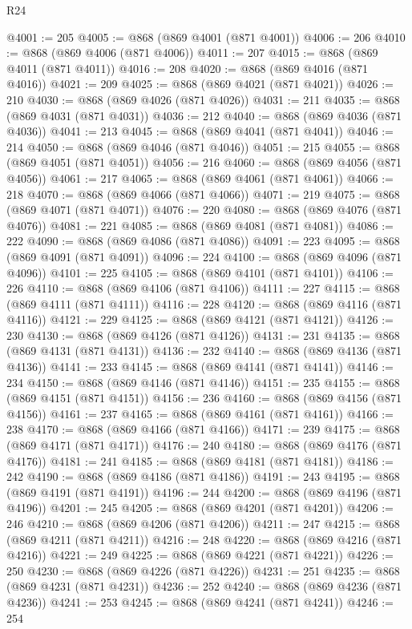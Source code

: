 \begin{lexlean}{R24}
\begin{coremodule}
@4001 := 205
@4005 := @868 (@869 @4001 (@871 @4001))
@4006 := 206
@4010 := @868 (@869 @4006 (@871 @4006))
@4011 := 207
@4015 := @868 (@869 @4011 (@871 @4011))
@4016 := 208
@4020 := @868 (@869 @4016 (@871 @4016))
@4021 := 209
@4025 := @868 (@869 @4021 (@871 @4021))
@4026 := 210
@4030 := @868 (@869 @4026 (@871 @4026))
@4031 := 211
@4035 := @868 (@869 @4031 (@871 @4031))
@4036 := 212
@4040 := @868 (@869 @4036 (@871 @4036))
@4041 := 213
@4045 := @868 (@869 @4041 (@871 @4041))
@4046 := 214
@4050 := @868 (@869 @4046 (@871 @4046))
@4051 := 215
@4055 := @868 (@869 @4051 (@871 @4051))
@4056 := 216
@4060 := @868 (@869 @4056 (@871 @4056))
@4061 := 217
@4065 := @868 (@869 @4061 (@871 @4061))
@4066 := 218
@4070 := @868 (@869 @4066 (@871 @4066))
@4071 := 219
@4075 := @868 (@869 @4071 (@871 @4071))
@4076 := 220
@4080 := @868 (@869 @4076 (@871 @4076))
@4081 := 221
@4085 := @868 (@869 @4081 (@871 @4081))
@4086 := 222
@4090 := @868 (@869 @4086 (@871 @4086))
@4091 := 223
@4095 := @868 (@869 @4091 (@871 @4091))
@4096 := 224
@4100 := @868 (@869 @4096 (@871 @4096))
@4101 := 225
@4105 := @868 (@869 @4101 (@871 @4101))
@4106 := 226
@4110 := @868 (@869 @4106 (@871 @4106))
@4111 := 227
@4115 := @868 (@869 @4111 (@871 @4111))
@4116 := 228
@4120 := @868 (@869 @4116 (@871 @4116))
@4121 := 229
@4125 := @868 (@869 @4121 (@871 @4121))
@4126 := 230
@4130 := @868 (@869 @4126 (@871 @4126))
@4131 := 231
@4135 := @868 (@869 @4131 (@871 @4131))
@4136 := 232
@4140 := @868 (@869 @4136 (@871 @4136))
@4141 := 233
@4145 := @868 (@869 @4141 (@871 @4141))
@4146 := 234
@4150 := @868 (@869 @4146 (@871 @4146))
@4151 := 235
@4155 := @868 (@869 @4151 (@871 @4151))
@4156 := 236
@4160 := @868 (@869 @4156 (@871 @4156))
@4161 := 237
@4165 := @868 (@869 @4161 (@871 @4161))
@4166 := 238
@4170 := @868 (@869 @4166 (@871 @4166))
@4171 := 239
@4175 := @868 (@869 @4171 (@871 @4171))
@4176 := 240
@4180 := @868 (@869 @4176 (@871 @4176))
@4181 := 241
@4185 := @868 (@869 @4181 (@871 @4181))
@4186 := 242
@4190 := @868 (@869 @4186 (@871 @4186))
@4191 := 243
@4195 := @868 (@869 @4191 (@871 @4191))
@4196 := 244
@4200 := @868 (@869 @4196 (@871 @4196))
@4201 := 245
@4205 := @868 (@869 @4201 (@871 @4201))
@4206 := 246
@4210 := @868 (@869 @4206 (@871 @4206))
@4211 := 247
@4215 := @868 (@869 @4211 (@871 @4211))
@4216 := 248
@4220 := @868 (@869 @4216 (@871 @4216))
@4221 := 249
@4225 := @868 (@869 @4221 (@871 @4221))
@4226 := 250
@4230 := @868 (@869 @4226 (@871 @4226))
@4231 := 251
@4235 := @868 (@869 @4231 (@871 @4231))
@4236 := 252
@4240 := @868 (@869 @4236 (@871 @4236))
@4241 := 253
@4245 := @868 (@869 @4241 (@871 @4241))
@4246 := 254

\end{coremodule}
\end{lexlean}
